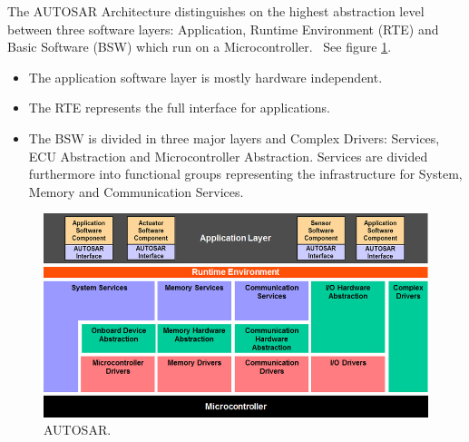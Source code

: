 The AUTOSAR Architecture distinguishes on the highest abstraction level between three software layers: Application, Runtime Environment (RTE) and Basic Software (BSW) which run on a Microcontroller.~\cite{website:autosar} See figure \ref{fig:autosar}.
\begin{itemize}
\item The application software layer is mostly hardware independent.
\item The RTE represents the full interface for applications.
\item The BSW is divided in three major layers and Complex Drivers: Services, ECU Abstraction and Microcontroller Abstraction. Services are divided furthermore into functional groups representing the infrastructure for System, Memory and Communication Services.
\end{itemize}

\begin{figure}[H]
\centering
\includegraphics[width=\textwidth]{./img/literature_autosar.png}
\caption{AUTOSAR.~\cite{website:autosar}}\label{fig:autosar}
\end{figure}

